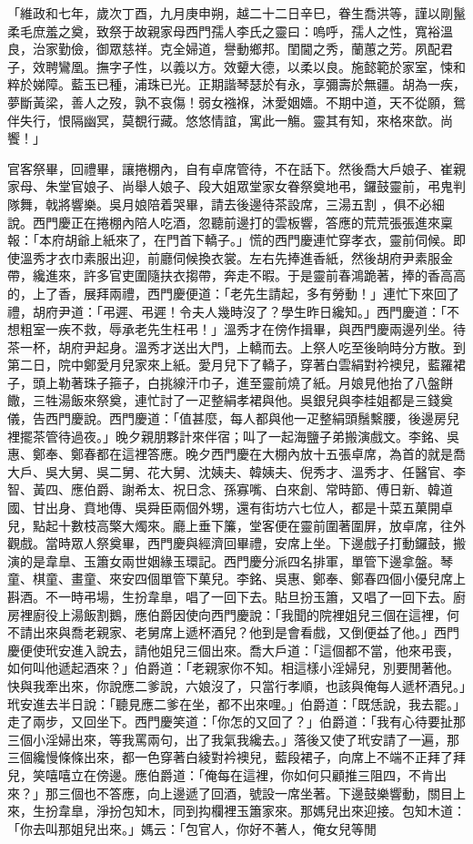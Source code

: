 「維政和七年，歲次丁酉，九月庚申朔，越二十二日辛巳，眷生喬洪等，謹以剛鬣柔毛庶羞之奠，致祭于故親家母西門孺人李氏之靈曰：嗚呼，孺人之性，寬裕溫良，治家勤儉，御眾慈祥。克全婦道，譽動鄉邦。閨閫之秀，蘭蕙之芳。夙配君子，效聘鸞凰。撫字子性，以義以方。效顰大德，以柔以良。施懿範於家室，悚和粹於娣障。藍玉已種，浦珠已光。正期諧琴瑟於有永，享彌壽於無疆。胡為一疾，夢斷黃梁，善人之歿，孰不哀傷！弱女襁褓，沐愛姻嬙。不期中道，天不從願，鴛伴失行，恨隔幽冥，莫覩行藏。悠悠情誼，寓此一觴。靈其有知，來格來歆。尚饗！」

官客祭畢，回禮畢，讓捲棚內，自有卓席管待，不在話下。然後喬大戶娘子、崔親家母、朱堂官娘子、尚舉人娘子、段大姐眾堂家女眷祭奠地弔，鑼鼓靈前，弔鬼判隊舞，戟將響樂。吳月娘陪着哭畢，請去後邊待茶設席，三湯五割 ，俱不必細說。西門慶正在捲棚內陪人吃酒，忽聽前邊打的雲板響，答應的荒荒張張進來稟報：「本府胡爺上紙來了，在門首下轎子。」慌的西門慶連忙穿孝衣，靈前伺候。即使溫秀才衣巾素服出迎，前廳伺候換衣裳。左右先捧進香紙，然後胡府尹素服金帶，纔進來，許多官吏圍隨扶衣搊帶，奔走不暇。于是靈前春鴻跪著，捧的香高高的，上了香，展拜兩禮，西門慶便道：「老先生請起，多有勞動！」連忙下來回了禮，胡府尹道：「弔遲、弔遲！令夫人幾時沒了？學生昨日纔知。」西門慶道：「不想粗室一疾不救，辱承老先生枉弔！」溫秀才在傍作揖畢，與西門慶兩邊列坐。待茶一杯，胡府尹起身。溫秀才送出大門，上轎而去。上祭人吃至後晌時分方散。到第二日，院中鄭愛月兒家來上紙。愛月兒下了轎子，穿著白雲絹對衿襖兒，藍羅裙子，頭上勒著珠子箍子，白挑線汗巾子，進至靈前燒了紙。月娘見他抬了八盤餅饊，三牲湯飯來祭奠，連忙討了一疋整絹孝裙與他。吳銀兒與李桂姐都是三錢奠儀，告西門慶說。西門慶道：「值甚麼，每人都與他一疋整絹頭鬚繫腰，後邊房兒裡擺茶管待過夜。」晚夕親朋夥計來伴宿；叫了一起海鹽子弟搬演戲文。李銘、吳惠、鄭奉、鄭春都在這裡答應。晚夕西門慶在大棚內放十五張卓席，為首的就是喬大戶、吳大舅、吳二舅、花大舅、沈姨夫、韓姨夫、倪秀才、溫秀才、任醫官、李智、黃四、應伯爵、謝希太、祝日念、孫寡嘴、白來創、常時節、傅日新、韓道國、甘出身、賁地傳、吳舜臣兩個外甥，還有街坊六七位人，都是十菜五菓開卓兒，點起十數枝高檠大燭來。廳上垂下簾，堂客便在靈前圍著圍屏，放卓席，往外觀戲。當時眾人祭奠畢，西門慶與經濟回畢禮，安席上坐。下邊戲子打動鑼鼓，搬演的是韋臯、玉簫女兩世姻緣玉環記。西門慶分派四名排軍，單管下邊拿盤。琴童、棋童、畫童、來安四個單管下菓兒。李銘、吳惠、鄭奉、鄭春四個小優兒席上斟酒。不一時弔場，生扮韋臯，唱了一回下去。貼旦扮玉簫，又唱了一回下去。廚房裡廚役上湯飯割鵝，應伯爵因使向西門慶說：「我聞的院裡姐兒三個在這裡，何不請出來與喬老親家、老舅席上遞杯酒兒？他到是會看戲，又倒便益了他。」西門慶便使玳安進入說去，請他姐兒三個出來。喬大戶道：「這個都不當，他來弔喪，如何叫他遞起酒來？」伯爵道：「老親家你不知。相這樣小淫婦兒，別要閒著他。快與我牽出來，你說應二爹說，六娘沒了，只當行孝順，也該與俺每人遞杯酒兒。」玳安進去半日說：「聽見應二爹在坐，都不出來哩。」伯爵道：「既恁說，我去罷。」走了兩步，又回坐下。西門慶笑道：「你怎的又回了？」伯爵道：「我有心待要扯那三個小淫婦出來，等我罵兩句，出了我氣我纔去。」落後又使了玳安請了一遍，那三個纔慢條條出來，都一色穿著白綾對衿襖兒，藍段裙子，向席上不端不正拜了拜兒，笑嘻嘻立在傍邊。應伯爵道：「俺每在這裡，你如何只顧推三阻四，不肯出來？」那三個也不答應，向上邊遞了回酒，號設一席坐著。下邊鼓樂響動，關目上來，生扮韋臯，淨扮包知木，同到抅欄裡玉簫家來。那媽兒出來迎接。包知木道：「你去叫那姐兒出來。」媽云：「包官人，你好不著人，俺女兒等閒